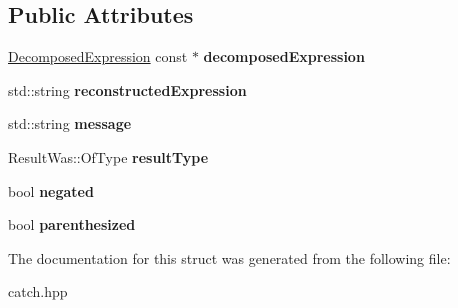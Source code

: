 \subsection*{Public Attributes}
\begin{DoxyCompactItemize}
\item 
\mbox{\label{structCatch_1_1AssertionResultData_a45b2bf2ed11da83d09dd78a2b7a44cd4}} 
\hyperlink{structCatch_1_1DecomposedExpression}{Decomposed\+Expression} const  $\ast$ {\bfseries decomposed\+Expression}
\item 
\mbox{\label{structCatch_1_1AssertionResultData_a9e809d36fffbeb1c7d0cbe7382dd9595}} 
std\+::string {\bfseries reconstructed\+Expression}
\item 
\mbox{\label{structCatch_1_1AssertionResultData_ac34215803c4c4a88f795879f61c1f7b4}} 
std\+::string {\bfseries message}
\item 
\mbox{\label{structCatch_1_1AssertionResultData_a7ceab4a7ff722aec5587e3748caf66b7}} 
Result\+Was\+::\+Of\+Type {\bfseries result\+Type}
\item 
\mbox{\label{structCatch_1_1AssertionResultData_a17773c6f999cfded12e470b0321694a1}} 
bool {\bfseries negated}
\item 
\mbox{\label{structCatch_1_1AssertionResultData_a8418e3744b5486cb7f0d79c84569078e}} 
bool {\bfseries parenthesized}
\end{DoxyCompactItemize}


The documentation for this struct was generated from the following file\+:\begin{DoxyCompactItemize}
\item 
catch.\+hpp\end{DoxyCompactItemize}
